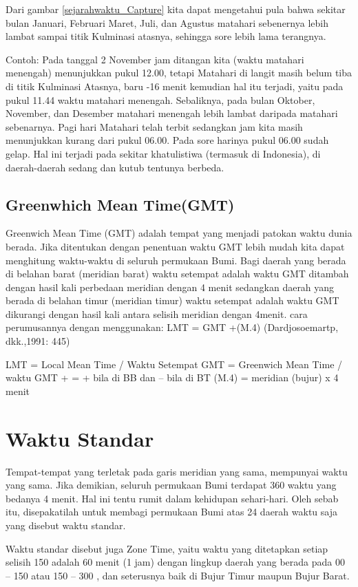  Dari gambar \ref{sejarahwaktu_Capture} kita dapat mengetahui pula bahwa sekitar bulan Januari, Februari
 Maret, Juli, dan Agustus matahari sebenernya lebih lambat sampai titik Kulminasi atasnya,
 sehingga sore lebih lama terangnya.
 
	Contoh: Pada tanggal 2 November jam ditangan kita (waktu matahari menengah) 
	menunjukkan pukul 12.00, tetapi Matahari di langit masih belum tiba di titik Kulminasi 
	Atasnya, baru -16 menit kemudian hal itu terjadi, yaitu pada pukul 11.44 waktu matahari 
	menengah. Sebaliknya, pada bulan Oktober, November, dan Desember matahari menengah 
	lebih lambat daripada matahari sebenarnya. Pagi hari Matahari telah terbit sedangkan 
	jam kita masih menunjukkan kurang dari pukul 06.00. Pada sore harinya pukul 06.00 sudah
	gelap. Hal ini terjadi pada sekitar khatulistiwa (termasuk di Indonesia), 
	di daerah-daerah sedang dan kutub tentunya berbeda.
	
\subsection{Greenwhich Mean Time(GMT)}
Greenwich Mean Time (GMT) adalah tempat yang menjadi
 patokan waktu dunia berada. Jika ditentukan dengan penentuan waktu GMT lebih mudah kita
 dapat menghitung waktu-waktu di seluruh permukaan Bumi. Bagi daerah yang
 berada di belahan barat (meridian barat) waktu setempat adalah waktu GMT
 ditambah dengan hasil kali perbedaan meridian dengan 4 menit sedangkan daerah
 yang berada di belahan timur (meridian timur) waktu setempat adalah waktu GMT
 dikurangi dengan hasil kali antara selisih meridian dengan 4menit. 
 cara perumusannya dengan menggunakan:
					LMT = GMT +(M.4)
			(Dardjosoemartp, dkk.,1991: 445)
			
	LMT = Local Mean Time / Waktu Setempat 
GMT = Greenwich Mean Time / waktu GMT
 + = + bila di BB dan – bila di BT 
(M.4) = meridian (bujur) x 4 menit

\section{Waktu Standar}
Tempat-tempat yang terletak pada garis meridian yang sama, mempunyai waktu yang sama.
 Jika demikian, seluruh permukaan Bumi terdapat 360 waktu yang bedanya 4 menit.
 Hal ini tentu rumit dalam kehidupan sehari-hari. Oleh sebab itu, disepakatilah untuk
 membagi permukaan Bumi atas 24 daerah waktu saja yang disebut waktu standar.
 
 Waktu standar disebut juga Zone Time, yaitu waktu yang ditetapkan setiap 
 selisih 150 adalah 60 menit (1 jam) dengan lingkup daerah yang berada pada 00 – 150
 atau 150 – 300 , dan seterusnya baik di Bujur Timur maupun Bujur Barat.
 
